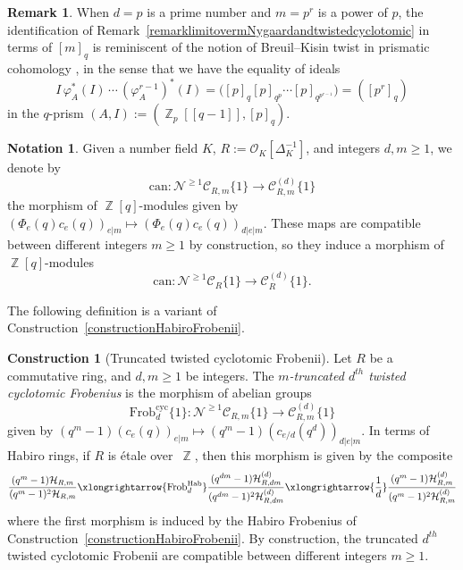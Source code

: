\documentclass[10pt,twoside]{scrarticle}
\newlength{\mar} \setlength{\mar}{1cm}%
\newlength{\len}
\theoremstyle{definition}
\newtheorem{remark}[theorem]{Remark}
\newtheorem{construction}[theorem]{Construction}
\newtheorem{notation}[theorem]{Notation}
\DeclareMathOperator{\Z}{\mathbb{Z}}
\newcommand{\CR}{\mathcal{C}_{R}}
\newcommand{\can}{\text{can}}
\newcommand{\CRm}{\mathcal{C}_{R,m}}
\newcommand{\Frob}{\mathrm{Frob}}
\newcommand{\Cyc}{\mathrm{cyc}}
\newcommand{\Hab}{\mathrm{Hab}}
\renewcommand{\ge}{\geqslant}
\numberwithin{equation}{theorem}
\begin{document}
\begin{remark}
    When $d=p$ is a prime number and $m=p^r$ is a power of $p$, the identification of Remark~\ref{remarklimitovermNygaardandtwistedcyclotomic} in terms of $[m]_q$ is reminiscent of the notion of Breuil--Kisin twist in prismatic cohomology \cite[Section~2.2]{bhatt_absolute_2022}, in the sense that we have the equality of ideals
    $$I\,\varphi_A^\ast(I)\,\cdots\,(\varphi_A^{r-1})^\ast(I) = \big([p]_q [p]_{q^p} \cdots [p]_{q^{p^{r-1}}}\big) = ([p^r]_q)$$
    in the $q$-prism $(A,I) := (\Z_p[\![q-1]\!],[p]_q)$.
\end{remark}

\begin{notation}\label{notationcanonicalmapcyclosyntomic}
    Given a number field $K$, $R:=\mathcal{O}_K[\Delta_K^{-1}]$, and integers $d,m \ge 1$, we denote by
    $$\can : \mathcal{N}^{\ge 1}\CRm\{1\} \longrightarrow \CRm^{(d)}\{1\}$$
    the morphism of $\Z[q]$-modules given by $(\Phi_e(q)c_e(q))_{e|m} \mapsto (\Phi_e(q)c_e(q))_{d|e|m}$. These maps are compatible between different integers $m \ge 1$ by construction, so they induce a morphism of $\Z[q]$\nobreakdash-modules $$\can : \mathcal{N}^{\ge 1} \CR\{1\} \longrightarrow \CR^{(d)}\{1\}.$$
\end{notation}

The following definition is a variant of Construction~\ref{constructionHabiroFrobenii}.

\begin{construction}[Truncated twisted cyclotomic Frobenii]\label{constructiontruncatedtwistedcyclotomicFrobenius}
    Let $R$ be a commutative ring, and $d,m \ge 1$ be integers. The \emph{$m$-truncated $d^{th}$ twisted cyclotomic Frobenius} is the morphism of abelian groups
    $$\Frob_d^{\Cyc}\{1\} : \mathcal{N}^{\ge 1} \CRm\{1\} \longrightarrow \CRm^{(d)}\{1\}$$
    given by $(q^m-1)(c_e(q))_{e|m} \mapsto (q^m-1)(c_{e/d}(q^d))_{d|e|m}$. In terms of Habiro rings, if $R$ is étale over~$\Z$, then this morphism is given by the composite
    $$\frac{(q^m-1)\mathcal{H}_{R,m}}{(q^m-1)^2\mathcal{H}_{R,m}} \xlongrightarrow{\Frob_d^{\Hab}} \frac{(q^{dm}-1)\mathcal{H}^{(d)}_{R,dm}}{(q^{dm}-1)^2\mathcal{H}^{(d)}_{R,dm}} \xlongrightarrow{\frac{1}{d}} \frac{(q^{m}-1)\mathcal{H}^{(d)}_{R,m}}{(q^{m}-1)^2\mathcal{H}^{(d)}_{R,m}}$$
    where the first morphism is induced by the Habiro Frobenius of Construction~\ref{constructionHabiroFrobenii}. By construction, the truncated $d^{th}$ twisted cyclotomic Frobenii are compatible between different integers $m \ge 1$.
\end{construction}
\end{document}
